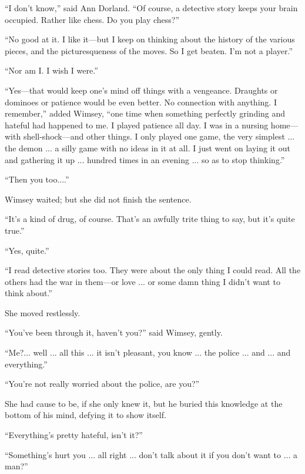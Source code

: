 \enquote{I don't know,} said Ann Dorland. \enquote{Of course, a detective story keeps your brain occupied. Rather like chess. Do you play chess?}

\enquote{No good at it. I like it\allowbreak---\allowbreak but I keep on thinking about the history of the various pieces, and the picturesqueness of the moves. So I get beaten. I'm not a player.}

\enquote{Nor am I. I wish I were.}

\enquote{Yes\allowbreak---\allowbreak that would keep one's mind off things with a vengeance. Draughts or dominoes or patience would be even better. No connection with anything. I remember,} added Wimsey, \enquote{one time when something perfectly grinding and hateful had happened to me. I played patience all day. I was in a nursing home\allowbreak---\allowbreak with shell-shock\allowbreak---\allowbreak and other things. I only played one game, the very simplest ... the demon ... a silly game with no ideas in it at all. I just went on laying it out and gathering it up ... hundred times in an evening ... so as to stop thinking.}

\enquote{Then you too....}

Wimsey waited; but she did not finish the sentence.

\enquote{It's a kind of drug, of course. That's an awfully trite thing to say, but it's quite true.}

\enquote{Yes, quite.}

\enquote{I read detective stories too. They were about the only thing I could read. All the others had the war in them\allowbreak---\allowbreak or love ... or some damn thing I didn't want to think about.}

She moved restlessly.

\enquote{You've been through it, haven't you?} said Wimsey, gently.

\enquote{Me?... well ... all this ... it isn't pleasant, you know ... the police ... and ... and everything.}

\enquote{You're not really worried about the police, are you?}

She had cause to be, if she only knew it, but he buried this knowledge at the bottom of his mind, defying it to show itself.

\enquote{Everything's pretty hateful, isn't it?}

\enquote{Something's hurt you ... all right ... don't talk about it if you don't want to ... a man?}

